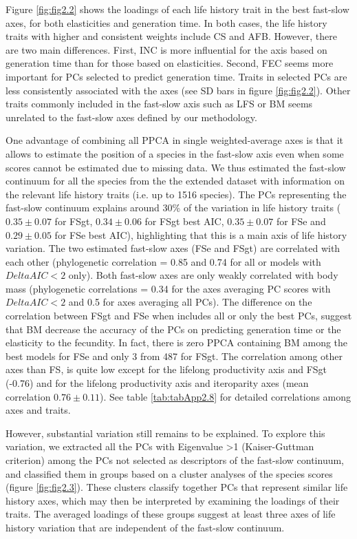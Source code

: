 Figure \ref{fig:fig2.2} shows the loadings of each life history trait in the 
best fast-slow axes, for both elasticities and generation time. In both cases,
the life history traits with higher and consistent weights include CS and AFB.
However, there are two main differences. First, INC is more
influential for the axis based on generation time than for those based on 
elasticities. Second, FEC seems more important for PCs selected to 
predict generation time. Traits in selected PCs are less consistently associated
with the axes (see SD bars in figure \ref{fig:fig2.2}). Other traits
commonly included in the fast-slow axis such as LFS or BM seems unrelated to 
the fast-slow axes defined by our methodology.

One advantage of combining all PPCA in single weighted-average axes is that it 
allows to estimate the position of a species in the fast-slow axis even when
some scores cannot be estimated due to missing data. We thus estimated the
fast-slow continuum for all the species from the the extended dataset with
information on the relevant life history traits (i.e. up to 1516 species).
The PCs representing the fast-slow continuum explains around 30\% of the
variation in life history traits ($0.35 \pm 0.07$ for FSgt, $0.34 \pm 0.06$ for
FSgt best AIC, $0.35 \pm 0.07$ for FSe and $0.29 \pm 0.05$ for FSe best AIC),
highlighting that this is a main axis of life history variation. The two
estimated fast-slow axes (FSe and FSgt) are correlated with each other
(phylogenetic correlation = 0.85 and 0.74 for all or models with
$Delta AIC < 2$ only).
Both fast-slow axes are only weakly correlated with body mass (phylogenetic
correlations = 0.34 for the axes averaging PC scores with $Delta AIC < 2$ and
0.5 for axes averaging all PCs). The difference on the correlation between FSgt
and FSe when includes all or only the best PCs, suggest that BM decrease the
accuracy of the PCs on predicting generation time or the elasticity to the
fecundity. In fact, there is zero PPCA containing BM among the best models
for FSe and only 3 from 487 for FSgt. The correlation among other axes than FS,
is quite low except for the lifelong productivity axis and FSgt (-0.76) and for
the lifelong productivity axis and iteroparity axes (mean correlation $0.76 \pm
0.11$). See table \ref{tab:tabApp2.8} for detailed correlations among axes and
traits.

However, substantial variation still remains to be explained. To explore this
variation, we extracted all the PCs with Eigenvalue \textgreater{1}
(Kaiser-Guttman criterion) among the
PCs not selected as descriptors of the fast-slow continuum, and classified them
in groups based on a cluster analyses of the species scores (figure
\ref{fig:fig2.3}). These clusters classify together PCs that represent similar
life history axes, which may then be interpreted by examining the loadings
of their traits.
The averaged loadings of these groups suggest at least three axes of life
history variation that are independent of the fast-slow continuum.



